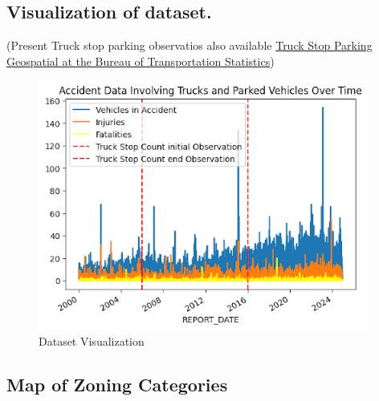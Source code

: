 \documentclass[
  12pt]{article}
\begin{document}
\subsection{\texorpdfstring{\textbf{Visualization of
dataset.}}{Visualization of dataset.}}\label{sec-a.-visualization-of-dataset.-}

(Present Truck stop parking observatios also available
\href{https://data-usdot.opendata.arcgis.com/datasets/usdot::truck-stop-parking/about}{Truck
Stop Parking \textbar{} Geospatial at the Bureau of Transportation
Statistics})

\begin{figure}[H]

{\centering \includegraphics[width=4.27083in,height=\textheight]{images/unnamed.png}

}

\caption{Dataset Visualization}

\end{figure}%

\subsection{Map of Zoning
Categories}\label{sec-b.-map-of-zoning-categories}
\end{document}
